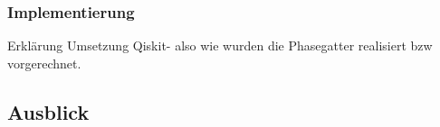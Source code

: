 \documentclass[
  a4paper, %
  10pt, %
  unnumberedsections, %
  twoside, %
]{LTJournalArticle}
\begin{document}
\subsubsection{Implementierung}
Erklärung Umsetzung Qiskit- also wie wurden die Phasegatter realisiert bzw vorgerechnet. 




\subsection{Ausblick}



\printbibliography %

\end{document}
